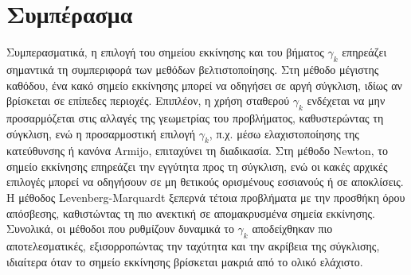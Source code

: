 \documentclass[a4paper,12pt]{article}
\begin{document}
\section*{Συμπέρασμα}

Συμπερασματικά, η επιλογή του σημείου εκκίνησης και του βήματος $\gamma_k$ επηρεάζει σημαντικά τη συμπεριφορά των
μεθόδων βελτιστοποίησης. Στη μέθοδο μέγιστης καθόδου, ένα κακό σημείο εκκίνησης μπορεί να οδηγήσει σε αργή σύγκλιση, 
ιδίως αν βρίσκεται σε επίπεδες περιοχές. Επιπλέον, η χρήση σταθερού $\gamma_k$ ενδέχεται να μην προσαρμόζεται στις 
αλλαγές της γεωμετρίας του προβλήματος, καθυστερώντας τη σύγκλιση, ενώ η προσαρμοστική επιλογή $\gamma_k$, π.χ. μέσω 
ελαχιστοποίησης της κατεύθυνσης ή κανόνα Armijo, επιταχύνει τη
διαδικασία. Στη μέθοδο Newton, το σημείο εκκίνησης επηρεάζει την
εγγύτητα προς τη σύγκλιση, ενώ οι κακές αρχικές επιλογές μπορεί να οδηγήσουν σε μη θετικούς ορισμένους εσσιανούς ή σε 
αποκλίσεις. Η μέθοδος Levenberg-Marquardt ξεπερνά τέτοια προβλήματα με
την προσθήκη όρου απόσβεσης, καθιστώντας τη πιο ανεκτική σε απομακρυσμένα σημεία εκκίνησης. Συνολικά, οι μέθοδοι που 
ρυθμίζουν δυναμικά το $\gamma_k$ αποδείχθηκαν πιο αποτελεσματικές, εξισορροπώντας την ταχύτητα και την ακρίβεια της 
σύγκλισης, ιδιαίτερα όταν το σημείο εκκίνησης βρίσκεται μακριά από το ολικό ελάχιστο.
\end{document}
